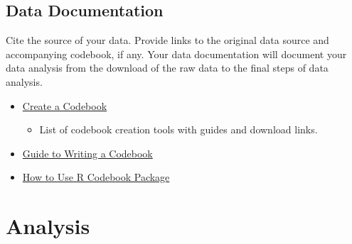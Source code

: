 \documentclass[]{book}
\providecommand{\tightlist}{%
  \setlength{\itemsep}{0pt}\setlength{\parskip}{0pt}}
\begin{document}
\hypertarget{data-documentation}{%
\section{Data Documentation}\label{data-documentation}}

Cite the source of your data. Provide links to the original data source and accompanying codebook, if any. Your data documentation will document your data analysis from the download of the raw data to the final steps of data analysis.

\begin{itemize}
\item
  \href{http://www.ddialliance.org/training/getting-started-new-content/create-a-codebook}{Create a Codebook}

  \begin{itemize}
  \tightlist
  \item
    List of codebook creation tools with guides and download links.
  \end{itemize}
\item
  \href{http://www.medicine.mcgill.ca/epidemiology/joseph/pbelisle/CodebookCookbook/CodebookCookbook.pdf}{Guide to Writing a Codebook}
\item
  \href{https://osf.io/zrsxd/download/}{How to Use R Codebook Package}
\end{itemize}

\hypertarget{analysis}{%
\chapter{Analysis}\label{analysis}}
\end{document}
